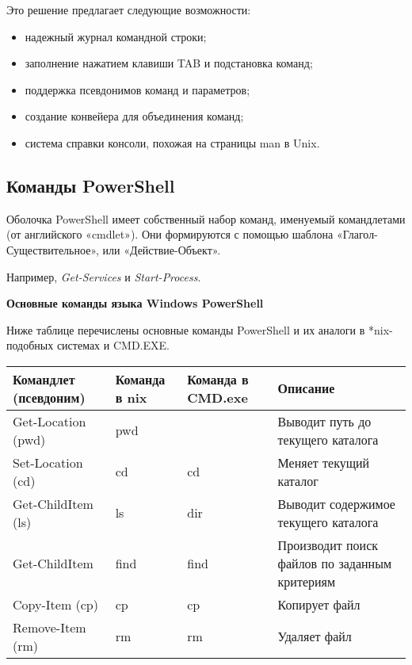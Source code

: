 \documentclass[12pt, a4paper, twoside]{article}
\begin{document}
\begin{flushleft}Это решение предлагает следующие возможности:\end{flushleft}
\begin{itemize}
     \item надежный журнал командной строки;
     \item заполнение нажатием клавиши TAB и подстановка команд;
     \item поддержка псевдонимов команд и параметров;
     \item создание конвейера для объединения команд;
     \item система справки консоли, похожая на страницы man в Unix.
\end{itemize}

\begin{center}
\subsection{Команды PowerShell}
\end{center}
\enlargethispage{3\baselineskip}

Оболочка PowerShell имеет собственный набор команд, именуемый командлетами (от английского «cmdlet»). Они формируются с помощью шаблона «Глагол-Существительное», или «Действие-Объект». 

Например, \textit{Get-Services} и \textit{Start-Process}.\\

\begin{flushleft}
\textbf{Основные команды языка Windows PowerShell}
\end{flushleft}

Ниже таблице перечислены основные команды PowerShell и их аналоги в *nix-подобных системах и CMD.EXE.

\begin{table}[H]
    \centering
    \begin{tabular}{ | m{3cm} | m{3cm}| m{3cm} | m{3cm} | } 
    \hline
    Командлет (псевдоним) & Команда в \*nix & Команда в CMD.exe & Описание\\
    \hline
    Get-Location (pwd) & pwd &  & Выводит путь до текущего каталога\\
    \hline
    Set-Location (cd) & cd & cd & Меняет текущий каталог \\
    \hline
    Get-ChildItem (ls) & ls & dir & Выводит содержимое текущего каталога\\ 
    \hline
    Get-ChildItem & find & find & Производит поиск файлов по заданным критериям\\ 
    \hline
    Copy-Item (cp)  & cp & cp & Копирует файл\\ 
    \hline
    Remove-Item (rm) & rm & rm & Удаляет файл\\ 
    \hline
    \end{tabular}
\end{table}
\end{document}
